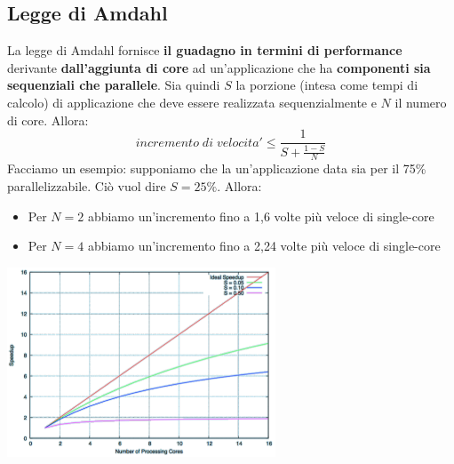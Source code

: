 \documentclass[12pt]{article}
\begin{document}
\subsection{Legge di Amdahl}
La legge di Amdahl fornisce \textbf{il guadagno in termini di performance} derivante \textbf{dall'aggiunta di core} ad un'applicazione che ha \textbf{componenti sia sequenziali che parallele}. Sia quindi $S$ la porzione (intesa come tempi di calcolo) di applicazione che deve essere realizzata sequenzialmente e $N$ il numero di core. Allora:
$$incremento \; di \; velocita' \leq \frac{1}{S + \frac{1-S}{N}}$$
Facciamo un esempio: supponiamo che la un'applicazione data sia per il 75\% parallelizzabile. Ciò vuol dire $S = 25\%$. Allora:
\begin{itemize}
    \item Per $N = 2$ abbiamo un'incremento fino a 1,6 volte più veloce di single-core
    \item Per $N = 4$ abbiamo un'incremento fino a 2,24 volte più veloce di single-core
\end{itemize}
\begin{center}
    \includegraphics[width = 0.60\textwidth]{Images/49.PNG}
\end{center}
\end{document}
